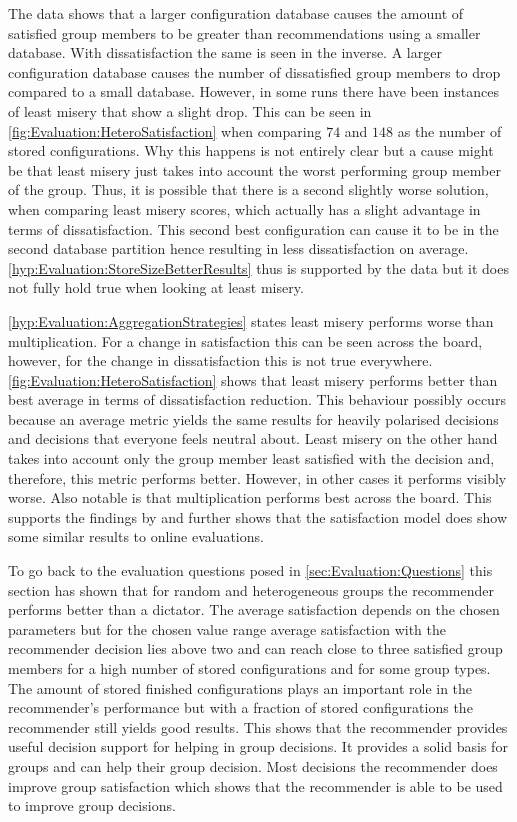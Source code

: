 The data shows that a larger configuration database causes the amount of satisfied group members to be greater than recommendations using a smaller database. With dissatisfaction the same is seen in the inverse. A larger configuration database causes the number of dissatisfied group members to drop compared to a small database. However, in some runs there have been instances of least misery that show a slight drop. This can be seen in \autoref{fig:Evaluation:HeteroSatisfaction} when comparing $74$ and $148$ as the number of stored configurations. Why this happens is not entirely clear but a cause might be that least misery just takes into account the worst performing group member of the group. Thus, it is possible that there is a second slightly worse solution, when comparing least misery scores, which actually has a slight advantage in terms of dissatisfaction. This second best configuration can cause it to be in the second database partition hence resulting in less dissatisfaction on average. \autoref{hyp:Evaluation:StoreSizeBetterResults} thus is supported by the data but it does not fully hold true when looking at least misery.

\autoref{hyp:Evaluation:AggregationStrategies} states least misery performs worse than multiplication. For a change in satisfaction this can be seen across the board, however, for the change in dissatisfaction this is not true everywhere. \autoref{fig:Evaluation:HeteroSatisfaction} shows that least misery performs better than best average in terms of dissatisfaction reduction. This behaviour possibly occurs because an average metric yields the same results for heavily polarised decisions and decisions that everyone feels neutral about. Least misery on the other hand takes into account only the group member least satisfied with the decision and, therefore, this metric performs better. However, in other cases it performs visibly worse. Also notable is that multiplication performs best across the board. This supports the findings by \citeauthor{Masthoff2015} \cite[~p. 755f]{Masthoff2015} and further shows that the satisfaction model does show some similar results to online evaluations.

To go back to the evaluation questions posed in \autoref{sec:Evaluation:Questions} this section has shown that for random and heterogeneous groups the recommender performs better than a dictator. The average satisfaction depends on the chosen parameters but for the chosen value range average satisfaction with the recommender decision lies above two and can reach close to three satisfied group members for a high number of stored configurations and for some group types. The amount of stored finished configurations plays an important role in the recommender's performance but with a fraction of stored configurations the recommender still yields good results. This shows that the recommender provides useful decision support for helping in group decisions. It provides a solid basis for groups and can help their group decision. Most decisions the recommender does improve group satisfaction which shows that the recommender is able to be used to improve group decisions.